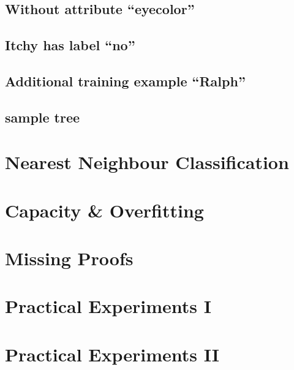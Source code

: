 \documentclass{scrartcl}
\begin{document}
\subsection{Without attribute ``eyecolor''}



\subsection{Itchy has label ``no''}



\subsection{Additional training example ``Ralph''}



\subsection{sample tree}

\begin{figure}
\centering 
{}
\end{figure}


\section{Nearest Neighbour Classification}
\section{Capacity \& Overfitting}
\section{Missing Proofs}
\section{Practical Experiments I}
\section{Practical Experiments II}
  
\end{document}
